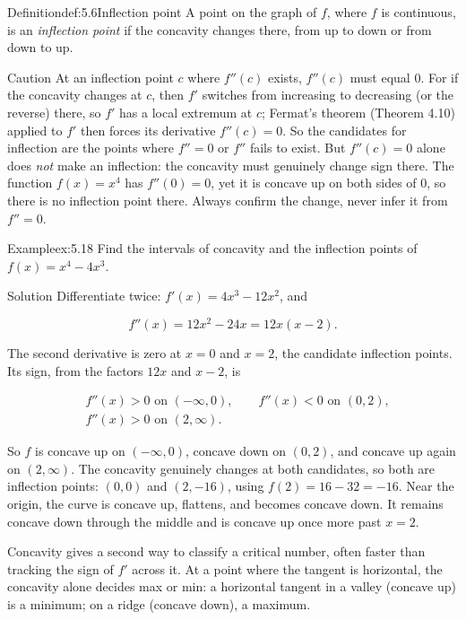 \documentclass[a4paper,12pt,oneside]{memoir}
\begin{document}
\begin{envdefinition}{Definition}{def:5.6}{Inflection point}
A point on the graph of \(f\), where \(f\) is continuous, is an \emph{inflection point} if the concavity changes there, from up to down or from down to up.
\end{envdefinition}
\begin{envcaution}{Caution}{}{}
At an inflection point \(c\) where \(f''(c)\) exists, \(f''(c)\) must equal \(0\). For if the concavity changes at \(c\), then \(f'\) switches from increasing to decreasing (or the reverse) there, so \(f'\) has a local extremum at \(c\); Fermat’s theorem (Theorem 4.10) applied to \(f'\) then forces its derivative \(f''(c) = 0\). So the candidates for inflection are the points where \(f'' = 0\) or \(f''\) fails to exist. But \(f''(c) = 0\) alone does \emph{not} make an inflection: the concavity must genuinely change sign there. The function \(f(x) = x^{4}\) has \(f''(0) = 0\), yet it is concave up on both sides of \(0\), so there is no inflection point there. Always confirm the change, never infer it from \(f'' = 0\).
\end{envcaution}
\begin{workedexample}
\begin{envexample}{Example}{ex:5.18}{}
Find the intervals of concavity and the inflection points of \(f(x) = x^{4} - 4x^{3}\).
\end{envexample}
\begin{envsolution}{Solution}{}{}
Differentiate twice: \(f'(x) = 4x^{3} - 12x^{2}\), and

\[ f''(x) = 12x^{2} - 24x = 12x(x - 2). \]

The second derivative is zero at \(x = 0\) and \(x = 2\), the candidate inflection points. Its sign, from the factors \(12x\) and \(x - 2\), is

\[ \begin{aligned}
          &f''(x) > 0 \text{ on } (-\infty, 0), \qquad f''(x) < 0 \text{ on } (0, 2), \\
          &f''(x) > 0 \text{ on } (2, \infty).
        \end{aligned} \]

So \(f\) is concave up on \((-\infty, 0)\), concave down on \((0, 2)\), and concave up again on \((2, \infty)\). The concavity genuinely changes at both candidates, so both are inflection points: \((0, 0)\) and \((2, -16)\), using \(f(2) = 16 - 32 = -16\). Near the origin, the curve is concave up, flattens, and becomes concave down. It remains concave down through the middle and is concave up once more past \(x = 2\). \qedmark
\end{envsolution}
\end{workedexample}
Concavity gives a second way to classify a critical number, often faster than tracking the sign of \(f'\) across it. At a point where the tangent is horizontal, the concavity alone decides max or min: a horizontal tangent in a valley (concave up) is a minimum; on a ridge (concave down), a maximum.
\end{document}
